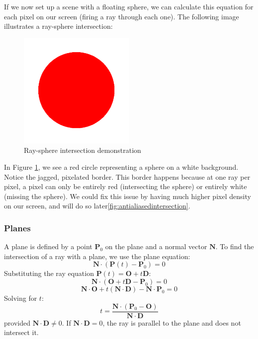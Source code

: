 \documentclass[12pt]{article}
\begin{document}
If we now set up a scene with a floating sphere, we can calculate this equation for each pixel on our screen (firing a ray through each one). The following image illustrates a ray-sphere intersection:

\begin{figure}[H]
    \centering
    \includegraphics[width=0.5\textwidth]{images/intersections/ray_sphere_intersection.png}
    \caption{Ray-sphere intersection demonstration}
    \label{fig:raysphereintersection}
\end{figure}

In Figure \ref{fig:raysphereintersection}, we see a red circle representing a sphere on a white background. Notice the jagged, pixelated border. This border happens because at one ray per pixel, a pixel can only be entirely red (intersecting the sphere) or entirely white (missing the sphere). We could fix this issue by having much higher pixel density on our screen, and will do so later\ref{fig:antialiasedintersection}.

\subsubsection{Planes}
A plane is defined by a point \(\mathbf{P}_0\) on the plane and a normal vector \(\mathbf{N}\). To find the intersection of a ray with a plane, we use the plane equation:
\[
    \mathbf{N} \cdot \left( \mathbf{P}(t) - \mathbf{P}_0 \right) = 0
\]
Substituting the ray equation \(\mathbf{P}(t) = \mathbf{O} + t\mathbf{D}\):
\[
    \mathbf{N} \cdot \left( \mathbf{O} + t\mathbf{D} - \mathbf{P}_0 \right) = 0
\]
\[
    \mathbf{N} \cdot \mathbf{O} + t \left( \mathbf{N} \cdot \mathbf{D} \right) - \mathbf{N} \cdot \mathbf{P}_0 = 0
\]
Solving for \(t\):
\[
    t = \frac{\mathbf{N} \cdot (\mathbf{P}_0 - \mathbf{O})}{\mathbf{N} \cdot \mathbf{D}}
\]
provided \(\mathbf{N} \cdot \mathbf{D} \neq 0\). If \(\mathbf{N} \cdot \mathbf{D} = 0\), the ray is parallel to the plane and does not intersect it.
\end{document}
